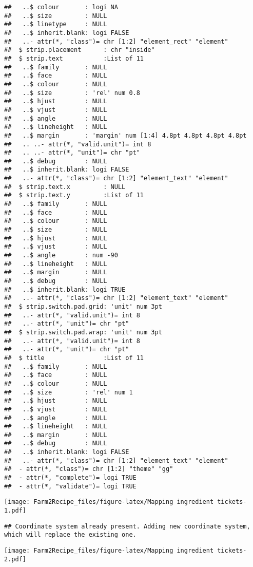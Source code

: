 \documentclass[]{article}
\begin{document}
\begin{verbatim}
##   ..$ colour       : logi NA
##   ..$ size         : NULL
##   ..$ linetype     : NULL
##   ..$ inherit.blank: logi FALSE
##   ..- attr(*, "class")= chr [1:2] "element_rect" "element"
##  $ strip.placement      : chr "inside"
##  $ strip.text           :List of 11
##   ..$ family       : NULL
##   ..$ face         : NULL
##   ..$ colour       : NULL
##   ..$ size         : 'rel' num 0.8
##   ..$ hjust        : NULL
##   ..$ vjust        : NULL
##   ..$ angle        : NULL
##   ..$ lineheight   : NULL
##   ..$ margin       : 'margin' num [1:4] 4.8pt 4.8pt 4.8pt 4.8pt
##   .. ..- attr(*, "valid.unit")= int 8
##   .. ..- attr(*, "unit")= chr "pt"
##   ..$ debug        : NULL
##   ..$ inherit.blank: logi FALSE
##   ..- attr(*, "class")= chr [1:2] "element_text" "element"
##  $ strip.text.x         : NULL
##  $ strip.text.y         :List of 11
##   ..$ family       : NULL
##   ..$ face         : NULL
##   ..$ colour       : NULL
##   ..$ size         : NULL
##   ..$ hjust        : NULL
##   ..$ vjust        : NULL
##   ..$ angle        : num -90
##   ..$ lineheight   : NULL
##   ..$ margin       : NULL
##   ..$ debug        : NULL
##   ..$ inherit.blank: logi TRUE
##   ..- attr(*, "class")= chr [1:2] "element_text" "element"
##  $ strip.switch.pad.grid: 'unit' num 3pt
##   ..- attr(*, "valid.unit")= int 8
##   ..- attr(*, "unit")= chr "pt"
##  $ strip.switch.pad.wrap: 'unit' num 3pt
##   ..- attr(*, "valid.unit")= int 8
##   ..- attr(*, "unit")= chr "pt"
##  $ title                :List of 11
##   ..$ family       : NULL
##   ..$ face         : NULL
##   ..$ colour       : NULL
##   ..$ size         : 'rel' num 1
##   ..$ hjust        : NULL
##   ..$ vjust        : NULL
##   ..$ angle        : NULL
##   ..$ lineheight   : NULL
##   ..$ margin       : NULL
##   ..$ debug        : NULL
##   ..$ inherit.blank: logi FALSE
##   ..- attr(*, "class")= chr [1:2] "element_text" "element"
##  - attr(*, "class")= chr [1:2] "theme" "gg"
##  - attr(*, "complete")= logi TRUE
##  - attr(*, "validate")= logi TRUE
\end{verbatim}

\texttt{[image: Farm2Recipe\_files/figure-latex/Mapping ingredient tickets-1.pdf]}

\begin{verbatim}
## Coordinate system already present. Adding new coordinate system, which will replace the existing one.
\end{verbatim}

\texttt{[image: Farm2Recipe\_files/figure-latex/Mapping ingredient tickets-2.pdf]}
\end{document}
